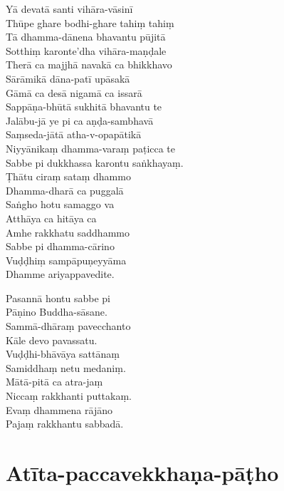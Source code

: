 Yā devatā santi vihāra-vāsinī\\
Thūpe ghare bodhi-ghare tahiṃ tahiṃ\\
Tā dhamma-dānena bhavantu pūjitā\\
Sotthiṃ karonte'dha vihāra-maṇḍale\\
Therā ca majjhā navakā ca bhikkhavo\\
Sārāmikā dāna-patī upāsakā\\
Gāmā ca desā nigamā ca issarā\\
Sappāṇa-bhūtā sukhitā bhavantu te\\
Jalābu-jā ye pi ca aṇḍa-sambhavā\\
Saṃseda-jātā atha-v-opapātikā\\
Niyyānikaṃ dhamma-varaṃ paṭicca te\\
Sabbe pi dukkhassa karontu saṅkhayaṃ.\\
Ṭhātu ciraṃ sataṃ dhammo\\
Dhamma-dharā ca puggalā\\
Saṅgho hotu samaggo va\\
Atthāya ca hitāya ca\\
Amhe rakkhatu saddhammo\\
Sabbe pi dhamma-cārino\\
Vuḍḍhiṃ sampāpuṇeyyāma\\
Dhamme ariyappavedite.

\clearpage

\sidepar{\pointerMark}%
Pasannā hontu sabbe pi\\
Pāṇino Buddha-sāsane.\\
Sammā-dhāraṃ pavecchanto\\
Kāle devo pavassatu.\\
Vuḍḍhi-bhāvāya sattānaṃ\\
Samiddhaṃ netu medaniṃ.\\
Mātā-pitā ca atra-jaṃ\\
Niccaṃ rakkhanti puttakaṃ.\\
Evaṃ dhammena rājāno\\
Pajaṃ rakkhantu sabbadā.


\section{Atīta-paccavekkhaṇa-pāṭho}

\begin{leader}
\end{leader}

